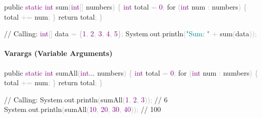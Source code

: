 \documentclass[
  justified,
  openright,
]{tufte-book}
\let\subsubsection\paragraph
\let\paragraph\paragraph
\newcommand{\BuiltInTok}[1]{#1}
\newcommand{\CommentTok}[1]{\textcolor{MidGray}{#1}}
\newcommand{\ControlFlowTok}[1]{\textcolor{BrandBlue}{#1}}
\newcommand{\DataTypeTok}[1]{\textcolor{Purple}{#1}}
\newcommand{\DecValTok}[1]{\textcolor{Purple}{#1}}
\newcommand{\FunctionTok}[1]{\textcolor{BrandBlue}{#1}}
\newcommand{\KeywordTok}[1]{\textcolor{BrandBlue}{#1}}
\newcommand{\NormalTok}[1]{#1}
\newcommand{\OperatorTok}[1]{\textcolor{DarkGray}{#1}}
\newcommand{\StringTok}[1]{\textcolor{Teal}{#1}}
\newenvironment{Shaded}{%
  \begin{snugshade}
}{%
  \end{snugshade}
}
\let\subsubsection\paragraph
\let\paragraph\paragraph
\begin{document}
\begin{Shaded}
\begin{Highlighting}[]
\KeywordTok{public} \DataTypeTok{static} \DataTypeTok{int} \FunctionTok{sum}\OperatorTok{(}\DataTypeTok{int}\OperatorTok{[]}\NormalTok{ numbers}\OperatorTok{)} \OperatorTok{\{}
    \DataTypeTok{int}\NormalTok{ total }\OperatorTok{=} \DecValTok{0}\OperatorTok{;}
    \ControlFlowTok{for} \OperatorTok{(}\DataTypeTok{int}\NormalTok{ num }\OperatorTok{:}\NormalTok{ numbers}\OperatorTok{)} \OperatorTok{\{}
\NormalTok{        total }\OperatorTok{+=}\NormalTok{ num}\OperatorTok{;}
    \OperatorTok{\}}
    \ControlFlowTok{return}\NormalTok{ total}\OperatorTok{;}
\OperatorTok{\}}

\CommentTok{// Calling:}
\DataTypeTok{int}\OperatorTok{[]}\NormalTok{ data }\OperatorTok{=} \OperatorTok{\{}\DecValTok{1}\OperatorTok{,} \DecValTok{2}\OperatorTok{,} \DecValTok{3}\OperatorTok{,} \DecValTok{4}\OperatorTok{,} \DecValTok{5}\OperatorTok{\};}
\BuiltInTok{System}\OperatorTok{.}\FunctionTok{out}\OperatorTok{.}\FunctionTok{println}\OperatorTok{(}\StringTok{"Sum: "} \OperatorTok{+} \FunctionTok{sum}\OperatorTok{(}\NormalTok{data}\OperatorTok{));}
\end{Highlighting}
\end{Shaded}

\subsubsection{Varargs (Variable
Arguments)}\label{varargs-variable-arguments}

\begin{Shaded}
\begin{Highlighting}[]
\KeywordTok{public} \DataTypeTok{static} \DataTypeTok{int} \FunctionTok{sumAll}\OperatorTok{(}\DataTypeTok{int}\KeywordTok{...}\NormalTok{ numbers}\OperatorTok{)} \OperatorTok{\{}
    \DataTypeTok{int}\NormalTok{ total }\OperatorTok{=} \DecValTok{0}\OperatorTok{;}
    \ControlFlowTok{for} \OperatorTok{(}\DataTypeTok{int}\NormalTok{ num }\OperatorTok{:}\NormalTok{ numbers}\OperatorTok{)} \OperatorTok{\{}
\NormalTok{        total }\OperatorTok{+=}\NormalTok{ num}\OperatorTok{;}
    \OperatorTok{\}}
    \ControlFlowTok{return}\NormalTok{ total}\OperatorTok{;}
\OperatorTok{\}}

\CommentTok{// Calling:}
\BuiltInTok{System}\OperatorTok{.}\FunctionTok{out}\OperatorTok{.}\FunctionTok{println}\OperatorTok{(}\FunctionTok{sumAll}\OperatorTok{(}\DecValTok{1}\OperatorTok{,} \DecValTok{2}\OperatorTok{,} \DecValTok{3}\OperatorTok{));}          \CommentTok{// 6}
\BuiltInTok{System}\OperatorTok{.}\FunctionTok{out}\OperatorTok{.}\FunctionTok{println}\OperatorTok{(}\FunctionTok{sumAll}\OperatorTok{(}\DecValTok{10}\OperatorTok{,} \DecValTok{20}\OperatorTok{,} \DecValTok{30}\OperatorTok{,} \DecValTok{40}\OperatorTok{));}    \CommentTok{// 100}
\end{Highlighting}
\end{Shaded}
\end{document}
